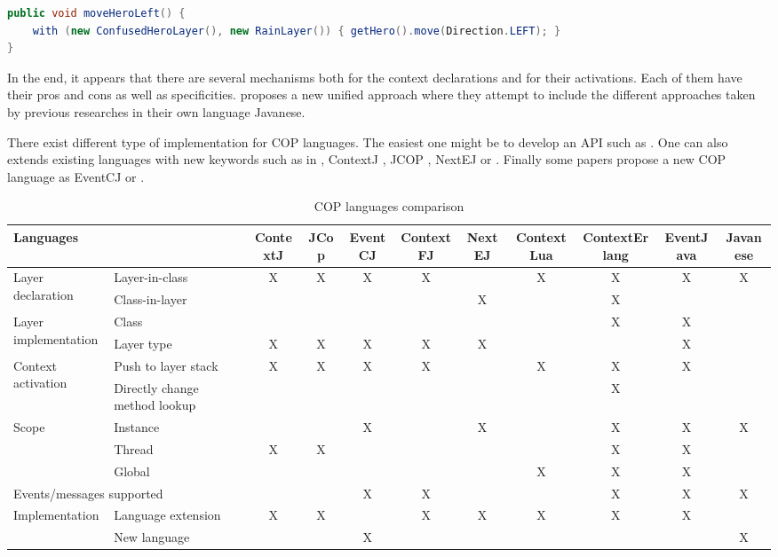\documentclass[a4paper]{article}
\begin{document}
\begin{lstlisting}[float, language=Java, caption=JCop layer activation example, label={listing:jcopwith}]
public void moveHeroLeft() {
	with (new ConfusedHeroLayer(), new RainLayer()) { getHero().move(Direction.LEFT); }
}
\end{lstlisting}


In the end, it appears that there are several mechanisms both for the context declarations and for their activations. Each of them have their pros and cons as well as specificities. \cite{kamina_unified_2013} proposes a new unified approach where they attempt to include the different approaches taken by previous researches in their own language Javanese.

There exist different type of implementation for COP languages. The easiest one might be to develop an API such as \cite{appeltauer_dedicated_2008}. One can also extends existing languages with new keywords such as in \cite{clarke_semantics_2009}, ContextJ \cite{haupt_contextj:_2011}, JCOP \cite{appeltauer_declarative_2013}, NextEJ \cite{kamina_towards_2009} or \cite{ghezzi_context_2010}. Finally some papers propose a new COP language as  EventCJ \cite{kamina_eventcj:_2011} or \cite{kamina_unified_2013}.


\begin{landscape}
  \begin{table}

  \begin{tabular}{p{3cm} p{2.5cm} c c c c c c c c c }
  \hline
  \multicolumn{2}{l}{Languages} & ContextJ & JCop & EventCJ & ContextFJ & NextEJ & ContextLua & ContextErlang & EventJava & Javanese \\
  \hline
  \multirow{2}{*}{Layer declaration} & Layer-in-class & X & X & X & X & & X & X & X & X \\
    & Class-in-layer & & & & & X & & X & & \\
  \hline
  \multirow{2}{*}{Layer implementation} & Class & & & & & & & X & X \\
    & Layer type & X & X & X & X & X & & & X \\    
  \hline  
  \multirow{2}{*}{Context activation} & Push to layer stack & X & X & X & X & & X & X & X \\
    & Directly change method lookup & & & & & & & X \\
  \hline  
  \multirow{3}{*}{Scope} & Instance & & & X & & X & & X & X & X \\
    & Thread & X & X & & & & & X & X \\
    & Global & & & & & & X & X & X \\
  \hline
  \multicolumn{2}{l}{\multirow{1}{*}{Events/messages supported}} & & & X & X & & & X & X & X \\
  \hline
  \multirow{3}{*}{Implementation} & Language extension & X & X & & X & X & X & X & X \\
    & New language & & & X & & & & & & X \\
  \end{tabular}
  \caption{COP languages comparison}
  \end{table}
\end{landscape}
\end{document}
